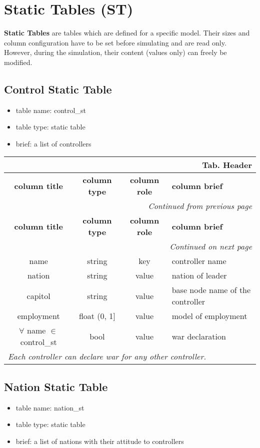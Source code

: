 \documentclass[a4paper,oneside,titlepage]{report}
\newcommand*{\LTHeaderIV}[5]{
  \multicolumn{4}{r}{\textbf{Tab. \thesubsection} \textbf{#1}}\\    
  \hline
  \textbf{#2} & \textbf{#3} & \textbf{#4} & \textbf{#5}\\
  \hline
  
  \endfirsthead
  \multicolumn{4}{r}{\textit{Continued from previous page}}\\    
  \hline
  \textbf{#2} & \textbf{#3} & \textbf{#4} & \textbf{#5}\\
  \hline
  \endhead
  \hline
  \multicolumn{4}{r}{\textit{Continued on next page}}\\
  \endfoot
  \hline
  \endlastfoot  
}
\begin{document}
\section{Static Tables (ST)}
\textbf{Static Tables} are tables which are defined for a specific model. Their sizes and column configuration have to be set before simulating and are read only. However, during the simulation, their content (values only) can freely be modified.

\subsection{Control Static Table}
\begin{itemize}
  \setlength{\itemsep}{0pt}
  \setlength{\parskip}{0pt}
\item table name: control\_st  
\item table type: static table   
\item brief: a list of controllers
\end{itemize}

\vspace{-0.5cm}
\begin{longtable}{ |c|c|c|l| } 
  \LTHeaderIV{Header}{column title}{column type}{column role}{column brief}                    
  name & string & key & controller name\\
  nation & string & value & nation of leader\\
  capitol & string & value & base node name of the controller\\
  employment & float (0, 1] & value & model of employment \\
  $\forall$ name $\in$ control\_st & bool & value & war declaration\\
  \multicolumn{4}{|l|}{\textit{Each controller can declare war for any other controller.}}\\
\end{longtable}        

\subsection{Nation Static Table}
\begin{itemize}
  \setlength{\itemsep}{0pt}
  \setlength{\parskip}{0pt}
\item table name: nation\_st  
\item table type: static table   
\item brief: a list of nations with their attitude to controllers 
\end{itemize}
\end{document}
